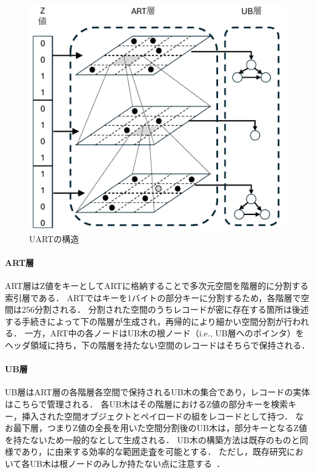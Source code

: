 \begin{figure}[t]
  \centering
  \includegraphics[scale = 1.75]{./figures/fig_uart.pdf}
  \caption{UARTの構造}
  \label{fig:uart}
\end{figure}

\paragraph{ART層}

ART層はZ値をキーとしてARTに格納することで多次元空間を階層的に分割する索引層である．
ARTではキーを1バイトの部分キーに分割するため，各階層で空間は256分割される．
分割された空間のうちレコードが密に存在する箇所は後述する手続きによって下の階層が生成され，再帰的により細かい空間分割が行われる．
一方，ART中の各ノードはUB木の根ノード（i.e., UB層へのポインタ）をヘッダ領域に持ち，下の階層を持たない空間のレコードはそちらで保持される．

\paragraph{UB層}

UB層はART層の各階層各空間で保持されるUB木の集合であり，レコードの実体はこちらで管理される．
各UB木はその階層におけるZ値の部分キーを検索キー，挿入された空間オブジェクトとペイロードの組をレコードとして持つ．
なお最下層，つまりZ値の全長を用いた空間分割後のUB木は，部分キーとなるZ値を持たないため一般的な\BTree{}として生成される．
UB木の構築方法は既存のものと同様であり，\BTree{}に由来する効率的な範囲走査を可能とする．
ただし，既存研究において各UB木は根ノードのみしか持たない点に注意する~\cite{deim:Suzuki2023}．






